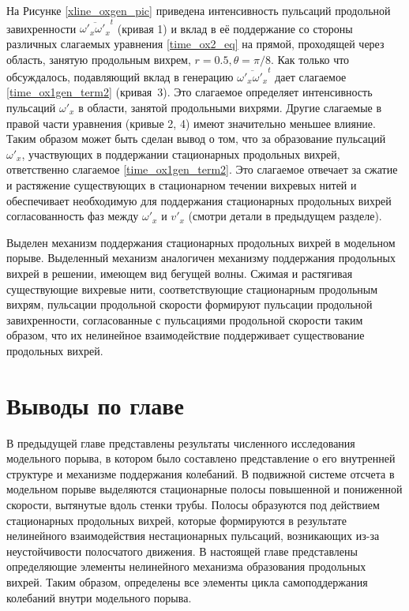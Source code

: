 На Рисунке \ref{xline_oxgen_pic} приведена интенсивность пульсаций продольной завихренности $\overline{\omega'_x \omega'_x}^t$ (кривая 1) и вклад в её поддержание со стороны различных слагаемых уравнения \eqref{time_ox2_eq} на прямой, проходящей через область, занятую продольным вихрем, $r = 0.5, \theta = \pi/8$. Как только что обсуждалось, подавляющий вклад в генерацию $\overline{\omega'_x \omega'_x}^t$ дает слагаемое \eqref{time_ox1gen_term2} (кривая~3). Это слагаемое определяет интенсивность пульсаций $\omega'_x$ в области, занятой продольными вихрями. Другие слагаемые в правой части уравнения (кривые 2, 4) имеют значительно меньшее влияние. Таким образом может быть сделан вывод о том, что за образование пульсаций $\omega'_x$, участвующих в поддержании стационарных продольных вихрей, ответственно слагаемое \eqref{time_ox1gen_term2}. Это слагаемое отвечает за сжатие и растяжение существующих в стационарном течении вихревых нитей и обеспечивает необходимую для поддержания стационарных продольных вихрей согласованность фаз между $\omega'_x$ и $v'_x$ (смотри детали в предыдущем разделе). 

Выделен механизм поддержания стационарных продольных вихрей в модельном порыве. Выделенный механизм аналогичен механизму поддержания продольных вихрей в решении, имеющем вид бегущей волны. Сжимая и растягивая существующие вихревые нити, соответствующие стационарным продольным вихрям, пульсации продольной скорости формируют пульсации продольной завихренности, согласованные с пульсациями продольной скорости таким образом, что их нелинейное взаимодействие поддерживает существование продольных вихрей. 


\section{Выводы по главе}

В предыдущей главе представлены результаты численного исследования модельного порыва, в котором было составлено представление о его внутренней структуре и механизме поддержания колебаний. В подвижной системе отсчета в модельном порыве выделяются стационарные полосы повышенной и пониженной скорости, вытянутые вдоль стенки трубы. Полосы образуются под действием стационарных продольных вихрей, которые формируются в результате нелинейного взаимодействия нестационарных пульсаций, возникающих из-за неустойчивости полосчатого движения. В настоящей главе представлены определяющие элементы нелинейного механизма образования продольных вихрей. Таким образом, определены все элементы цикла самоподдержания колебаний внутри модельного порыва. 

